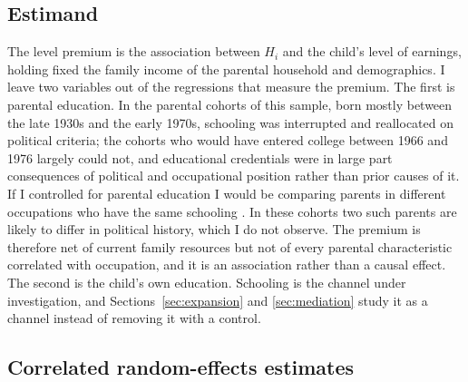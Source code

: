\documentclass[11pt]{article}
\begin{document}
\subsection{Estimand}
\label{sec:estimand}

The level premium is the association between $H_i$ and the child's level of
earnings, holding fixed the family income of the parental household and demographics. I leave two variables out of the regressions that measure the premium.
The first is parental education. In the parental cohorts of this sample, born mostly between the late 1930s and the early 1970s, schooling was interrupted and reallocated on
political criteria; the cohorts who would have entered college between 1966 and 1976 largely could not, and educational credentials were in large
part consequences of political and occupational position rather than
prior causes of it. If I controlled for parental education I would be
comparing parents in different occupations who have the same schooling \citep{AcharyaBlackwellSen2016, AngristPischke2009}.
In these cohorts two such parents are likely to differ in political
history, which I do not observe. The premium is therefore net of current family resources but not of every parental characteristic correlated with occupation, and it is an association rather than a causal effect. The second is the child's own education. Schooling is the
channel under investigation, and Sections~\ref{sec:expansion} and
\ref{sec:mediation} study it as a channel instead of removing it with a
control.

\subsection{Correlated random-effects estimates}
\label{sec:cre}
\end{document}
